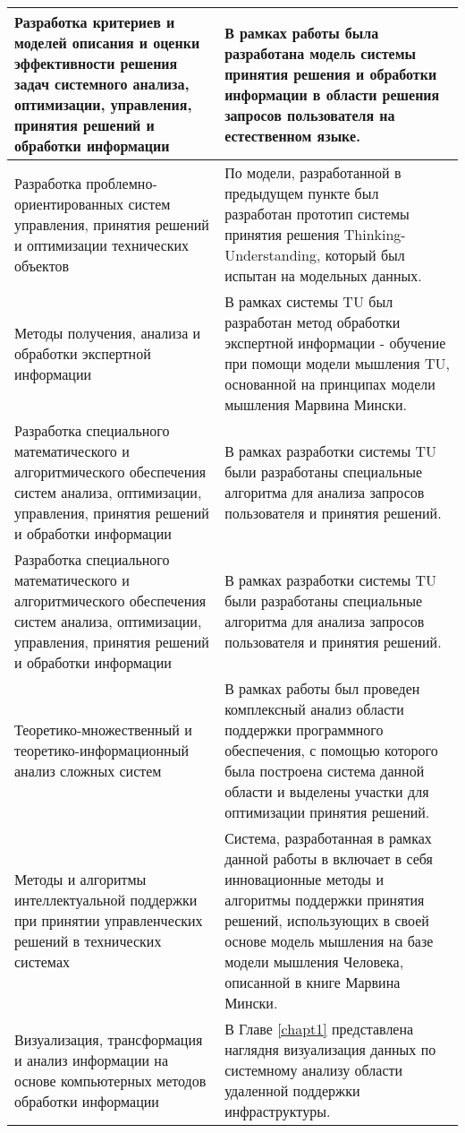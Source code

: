 \begin{longtable}{|p{7cm}|p{8cm}|}
\hline \hline
\endlastfoot
\hline
   Разработка критериев и моделей описания и оценки эффективности решения задач системного анализа, оптимизации, управления, принятия решений и обработки информации & В рамках работы была разработана модель системы принятия решения и обработки информации в области решения запросов пользователя на естественном языке. \\
   \hline
   Разработка проблемно-ориентированных систем управления, принятия решений и оптимизации технических объектов & По модели, разработанной в предыдущем пункте был разработан прототип системы принятия решения Thinking-Understanding, который был испытан на модельных данных.\\
   \hline
   Методы получения, анализа и обработки экспертной информации & В рамках системы TU был разработан метод обработки экспертной информации - обучение при помощи модели мышления TU, основанной на принципах модели мышления Марвина Мински. \\
   \hline
   Разработка специального математического и алгоритмического обеспечения систем анализа, оптимизации, управления, принятия решений и обработки информации & В рамках разработки системы TU были разработаны специальные алгоритма для анализа запросов пользователя и принятия решений.\\
  \hline 
  Разработка специального математического и алгоритмического обеспечения систем анализа, оптимизации, управления, принятия решений и обработки информации & В рамках разработки системы TU были разработаны специальные алгоритма для анализа запросов пользователя и принятия решений.\\
  \hline 
  Теоретико-множественный и теоретико-информационный анализ сложных систем & В рамках работы был проведен комплексный анализ области поддержки программного обеспечения, с помощью которого была построена система данной области и выделены участки для оптимизации принятия решений.\\
  \hline
  Методы и алгоритмы интеллектуальной поддержки при принятии управленческих решений в технических системах & Система, разработанная в рамках данной работы в включает в себя инновационные методы и алгоритмы поддержки принятия решений, использующих в своей основе модель мышления на базе модели мышления Человека, описанной в книге Марвина Мински. \\ 
  \hline
  Визуализация, трансформация и анализ информации на основе компьютерных методов обработки информации & В Главе \ref{chapt1} представлена наглядня визуализация данных по системному анализу области удаленной поддержки инфраструктуры. \\
  \hline	
\end{longtable}

